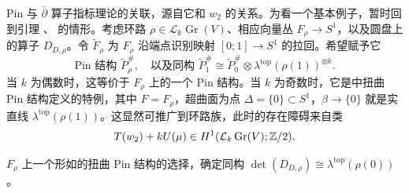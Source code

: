 Pin 与 $\bar\partial$ 算子指标理论的关联，源自它和 $w_2$ 的关系。为看一个基本例子，暂时回到引理 、 的情形。考虑环路 $\rho\in\mathcal L_k\operatorname{Gr}(V)$、相应向量丛 $F_\rho\to S^1$，以及圆盘上的算子 $D_{D,\allowbreak \rho}$。令 $\widetilde F_\rho$ 为 $F_\rho$ 沿端点识别映射 $[0;1]\to S^1$ 的拉回。希望赋予它
\begin{equation}\label{eq:11.32}
\text{Pin 结构 }\widetilde P_\rho^\#,\quad\text{以及同构 }\widetilde P_1^\#\cong\widetilde P_0^\#\otimes\lambda^{\mathrm{top}}(\rho(1))^{\otimes k}.
\end{equation}
当 $k$ 为偶数时，这等价于 $F_\rho$ 上的一个 Pin 结构。当 $k$ 为奇数时，它是中扭曲 Pin 结构定义的特例，其中 $F=F_\rho$，超曲面为点 $\Delta=\{0\}\subset S^1$，$\beta\to\{0\}$ 就是实直线 $\lambda^{\mathrm{top}}(\rho(1))$。这显然可推广到环路族，此时的存在障碍来自类
\begin{equation}\label{eq:11.33}
T(w_2)+kU(\mu)\in H^1(\mathcal L_k\operatorname{Gr}(V);\mathbb Z/2).
\end{equation}
\begin{lemma}\label{st:11.17}
$F_\rho$ 上一个形如的扭曲 Pin 结构的选择，确定同构 $\det(D_{D,\allowbreak \rho})\cong\lambda^{\mathrm{top}}(\rho(0))$。
\end{lemma}
